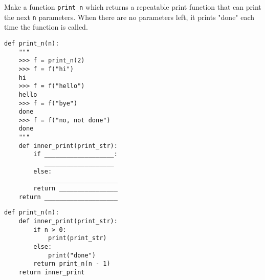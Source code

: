 \begin{blocksection}
\question Make a function \texttt{print\_n} which returns a repeatable print function that can print the next \texttt{n} parameters. When there are no parameters left, it prints "done" each time the function is called.
\begin{lstlisting}
def print_n(n):
    """
    >>> f = print_n(2)
    >>> f = f("hi")
    hi
    >>> f = f("hello")
    hello
    >>> f = f("bye")
    done
    >>> f = f("no, not done")
    done
    """
    def inner_print(print_str):
        if ___________________:
           ___________________
        else:
           ____________________
        return ________________
    return ____________________
\end{lstlisting}

\begin{solution}
\begin{lstlisting}
def print_n(n):
    def inner_print(print_str):
        if n > 0:
            print(print_str)
        else:
            print("done")
        return print_n(n - 1)
    return inner_print
\end{lstlisting}
\end{solution}
\end{blocksection}